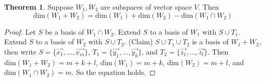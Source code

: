 \documentclass{article}
\theoremstyle{definition}
\newtheorem{theorem}{Theorem}[section]
\theoremstyle{remark}
\begin{document}
\begin{theorem}
    Suppose $W_1, W_2$ are subspaces of vector space $V$. Then
    \[
    \text{dim}(W_1+W_2)=\text{dim}(W_1)+\text{dim}(W_2)-\text{dim}(W_1\cap W_2)
    \]
\end{theorem}

\begin{proof}
    Let $S$ be a basis of $W_1\cap W_2$. 
    Extend $S$ to a basis of $W_1$ with $S\cup T_1$.
    Extend $S$ to a basis of $W_2$ with $S\cup T_2$.
    (Claim) $S\cup T_1\cup T_2$ is a basis of $W_1+W_2$, then write $S=\{\vec{x_1}, \dots, \vec{x_m}\}$, $T_1=\{\vec{y_1}, \dots, \vec{y_k}\}$, and $T_2=\{\vec{z_1}, \dots, \vec{z_l}\}$. 
    Then $\text{dim}(W_1+W_2)=m+k+l$, $\text{dim}(W_1)=m+k$, $\text{dim}(W_2)=m+l$, and $\text{dim}(W_1\cap W_2)=m$. So the equation holds.
\end{proof}
\end{document}
